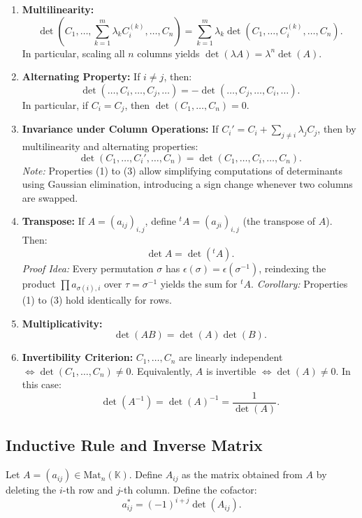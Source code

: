 \documentclass[11pt, a4paper]{article}
\newcommand{\K}{\mathbb{K}}
\begin{document}
\begin{enumerate}
  \item \textbf{Multilinearity:}
  \[
    \det\left(C_1, \dots, \sum_{k=1}^m \lambda_k C_i^{(k)}, \dots, C_n\right) = \sum_{k=1}^m \lambda_k \det\left(C_1, \dots, C_i^{(k)}, \dots, C_n\right).
  \]
  In particular, scaling all $n$ columns yields $\det(\lambda A) = \lambda^n \det(A)$.

  \item \textbf{Alternating Property:}
  If $i \neq j$, then:
  \[
    \det(\dots, C_i, \dots, C_j, \dots) = -\det(\dots, C_j, \dots, C_i, \dots).
  \]
  In particular, if $C_i = C_j$, then $\det(C_1, \dots, C_n) = 0$.

  \item \textbf{Invariance under Column Operations:}
  If $C_i' = C_i + \sum_{j \neq i} \lambda_j C_j$, then by multilinearity and alternating properties:
  \[
    \det(C_1, \dots, C_i', \dots, C_n) = \det(C_1, \dots, C_i, \dots, C_n).
  \]
  \textit{Note:} Properties (1) to (3) allow simplifying computations of determinants using Gaussian elimination, introducing a sign change whenever two columns are swapped.

  \item \textbf{Transpose:}
  If $A = (a_{ij})_{i,j}$, define ${}^t A = (a_{ji})_{i,j}$ (the transpose of $A$). Then:
  \[
    \det A = \det({}^t A).
  \]
  \textit{Proof Idea:} Every permutation $\sigma$ has $\epsilon(\sigma) = \epsilon(\sigma^{-1})$, reindexing the product $\prod a_{\sigma(i),i}$ over $\tau = \sigma^{-1}$ yields the sum for ${}^t A$.
  \textit{Corollary:} Properties (1) to (3) hold identically for rows.

  \item \textbf{Multiplicativity:}
  \[
    \det(AB) = \det(A) \det(B).
  \]

  \item \textbf{Invertibility Criterion:}
  $C_1, \dots, C_n$ are linearly independent $\iff \det(C_1, \dots, C_n) \neq 0$.
  Equivalently, $A$ is invertible $\iff \det(A) \neq 0$.
  In this case:
  \[
    \det(A^{-1}) = \det(A)^{-1} = \frac{1}{\det(A)}.
  \]
\end{enumerate}

\subsection{Inductive Rule and Inverse Matrix}

Let $A = (a_{ij}) \in \text{Mat}_n(\K)$. Define $A_{ij}$ as the matrix obtained from $A$ by deleting the $i$-th row and $j$-th column.
Define the cofactor:
\[
  a_{ij}^* = (-1)^{i+j} \det(A_{ij}).
\]
\end{document}
